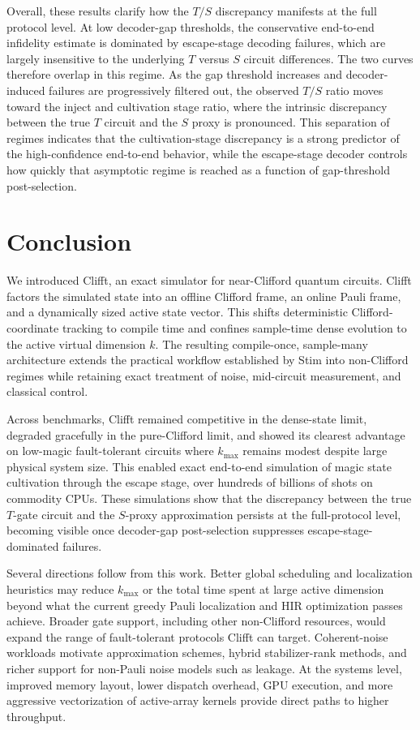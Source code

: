\documentclass[a4paper, onecolumn, unpublished]{quantumarticle}
\begin{document}
    Overall, these results clarify how the $T/S$ discrepancy manifests at the full protocol level. At low decoder-gap thresholds, the conservative end-to-end infidelity estimate is dominated by escape-stage decoding failures, which are largely insensitive to the underlying $T$ versus $S$ circuit differences. The two curves therefore overlap in this regime. As the gap threshold increases and decoder-induced failures are progressively filtered out, the observed $T/S$ ratio moves toward the inject and cultivation stage ratio, where the intrinsic discrepancy between the true $T$ circuit and the $S$ proxy is pronounced. This separation of regimes indicates that the cultivation-stage discrepancy is a strong predictor of the high-confidence end-to-end behavior, while the escape-stage decoder controls how quickly that asymptotic regime is reached as a function of gap-threshold post-selection.

    \FloatBarrier
    \section{Conclusion}
    \label{sec:conclusion}

    We introduced Clifft, an exact simulator for near-Clifford quantum circuits. Clifft factors the simulated state into an offline Clifford frame, an online Pauli frame, and a dynamically sized active state vector. This shifts deterministic Clifford-coordinate tracking to compile time and confines sample-time dense evolution to the active virtual dimension $k$. The resulting compile-once, sample-many architecture extends the practical workflow established by Stim into non-Clifford regimes while retaining exact treatment of noise, mid-circuit measurement, and classical control.

    Across benchmarks, Clifft remained competitive in the dense-state limit, degraded gracefully in the pure-Clifford limit, and showed its clearest advantage on low-magic fault-tolerant circuits where $k_{\max}$ remains modest despite large physical system size. This enabled exact end-to-end simulation of magic state cultivation through the escape stage, over hundreds of billions of shots on commodity CPUs. These simulations show that the discrepancy between the true $T$-gate circuit and the $S$-proxy approximation persists at the full-protocol level, becoming visible once decoder-gap post-selection suppresses escape-stage-dominated failures.

    Several directions follow from this work. Better global scheduling and localization heuristics may reduce $k_{\max}$ or the total time spent at large active dimension beyond what the current greedy Pauli localization and HIR optimization passes achieve. Broader gate support, including other non-Clifford resources, would expand the range of fault-tolerant protocols Clifft can target. Coherent-noise workloads motivate approximation schemes, hybrid stabilizer-rank methods, and richer support for non-Pauli noise models such as leakage. At the systems level, improved memory layout, lower dispatch overhead, GPU execution, and more aggressive vectorization of active-array kernels provide direct paths to higher throughput.
\end{document}
